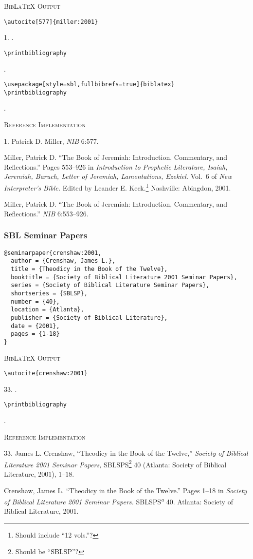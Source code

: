 \documentclass[a4paper]{article}
\newcommand\citetestns[3]{%
  {\textsc{BibLaTeX Output}\par
   \nobreak
   \texttt{\textbackslash autocite[#2]\{#3\}}\par
   \color{biblatex-colour}
   #1. \cite[#2]{#3}.\par
   \color{black}
   \texttt{\textbackslash printbibliography}\par
   \color{biblatex-colour}
   \sloppy\hangindent\bibindent\bibentrycite{#3}.\par}}
\newcommand\citetestnsnp[2]{%
  {\textsc{BibLaTeX Output}\par
   \nobreak
   \texttt{\textbackslash autocite\{#2\}}\par
   \color{biblatex-colour}
   #1. \cite{#2}.\par
   \color{black}
   \texttt{\textbackslash printbibliography}\par
   \color{biblatex-colour}
   \hangindent\bibindent\bibentrycite{#2}.\par}}
\newenvironment{refimp}{%
  \begin{minipage}{\linewidth}
    \setlength{\parskip}{1ex}
    \textsc{Reference Implementation}\par
    \nobreak
    \color{reference-colour}
}{\end{minipage}}
\begin{document}
\citetestns{1}{577}{miller:2001}

\texttt{\textbackslash usepackage[style=sbl,fullbibrefs=true]\{biblatex\} \\
  \textbackslash printbibliography}

{\color{biblatex-colour}
 \toggletrue{fullbibrefs}
 \hangindent\bibindent{}.\par}

\begin{refimp}
  1. Patrick D. Miller, \emph{NIB} 6:577.

  \hangindent\bibindent Miller, Patrick D. “The Book of Jeremiah:
  Introduction, Commentary, and Reflections.” Pages 553–926 in
  \emph{Introduction to Prophetic Literature, Isaiah, Jeremiah, Baruch, Letter
  of Jeremiah, Lamentations, Ezekiel.} Vol.~6 of \emph{New Interpreter’s
  Bible.} Edited by Leander E. Keck.\footnote{Should include “12 vols.”?}
  Nashville: Abingdon, 2001.

  \hangindent\bibindent Miller, Patrick D. “The Book of Jeremiah:
  Introduction, Commentary, and Reflections.” \emph{NIB} 6:553–926.
\end{refimp}

\subsubsection{SBL Seminar Papers}

\begin{lstlisting}
@seminarpaper{crenshaw:2001,
  author = {Crenshaw, James L.},
  title = {Theodicy in the Book of the Twelve},
  booktitle = {Society of Biblical Literature 2001 Seminar Papers},
  series = {Society of Biblical Literature Seminar Papers},
  shortseries = {SBLSP},
  number = {40},
  location = {Atlanta},
  publisher = {Society of Biblical Literature},
  date = {2001},
  pages = {1-18}
}
\end{lstlisting}

\citetestnsnp{33}{crenshaw:2001}

\begin{refimp}
  33. James L. Crenshaw, “Theodicy in the Book of the Twelve,” \emph{Society
  of Biblical Literature 2001 Seminar Papers,} SBLSPS\footnote{Should be
  “SBLSP”?} 40 (Atlanta: Society of Biblical Literature, 2001), 1–18.
  
  \hangindent\bibindent Crenshaw, James L. “Theodicy in the Book of the
  Twelve.” Pages 1–18 in \emph{Society of Biblical Literature 2001 Seminar
  Papers.} SBLSPS\textsuperscript{\emph{a}} 40. Atlanta: Society of Biblical
  Literature, 2001.
\end{refimp}
\end{document}
